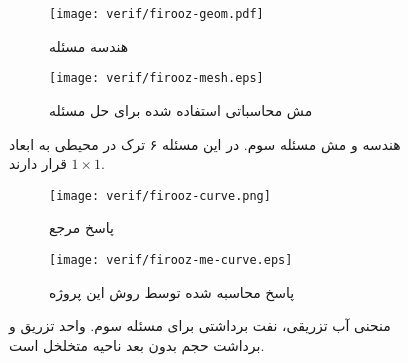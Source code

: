 \begin{figure}
\begin{subfigure}{0.5\textwidth}
\texttt{[image: verif/firooz-geom.pdf]} 
\caption{هندسه مسئله}
\label{fig:4firoozprob-geo}
\end{subfigure}
\begin{subfigure}{0.5\textwidth}
\texttt{[image: verif/firooz-mesh.eps]} 
\caption{مش محاسباتی استفاده شده برای حل مسئله}
\label{fig:4firoozprob-mesh}
\end{subfigure}
\caption[هندسه و مش مسئله سوم]{هندسه و مش مسئله سوم. در این مسئله ۶ ترک در محیطی به ابعاد $1\times 1$ قرار دارند.}
\label{fig:4firoozprob} \vspace{1cm}
\begin{subfigure}{0.5\textwidth}
\texttt{[image: verif/firooz-curve.png]} 
\caption{پاسخ مرجع \cite{hoteitf}}
\label{fig:4firoozcurve-him}
\end{subfigure}
\begin{subfigure}{0.5\textwidth}
\texttt{[image: verif/firooz-me-curve.eps]} 
\caption{پاسخ محاسبه شده توسط روش این پروژه}
\label{fig:4firoozcurve-me}
\end{subfigure}
\caption[منحنی آب تزریقی، نفت برداشتی برای مسئله سوم]{منحنی آب تزریقی، نفت برداشتی برای مسئله سوم. واحد تزریق و برداشت حجم بدون بعد ناحیه متخلخل است.}
\label{fig:4firoozcurve}
\end{figure}


